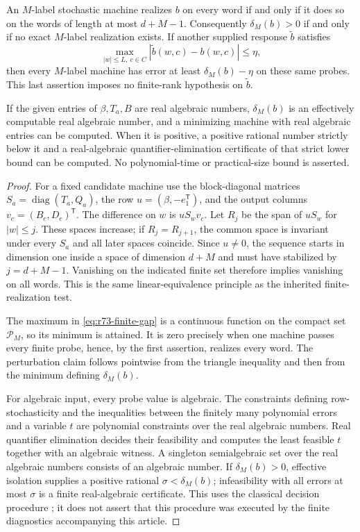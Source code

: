 \begin{theorem}\label{thm:r73-finite-tests}
An $M$-label stochastic machine realizes $b$ on every word if and only if it
does so on the words of length at most $d+M-1$. Consequently
$\delta_M(b)>0$ if and only if no exact $M$-label realization exists.
If another supplied response $\widetilde b$ satisfies
\[
 \max_{|w|\le L,\ c\in C}|\widetilde b(w,c)-b(w,c)|\le\eta,
\]
then every $M$-label machine has error at least $\delta_M(b)-\eta$ on these
same probes. This last assertion imposes no finite-rank hypothesis on
$\widetilde b$.

If the given entries of $\beta,T_a,B$ are real algebraic numbers,
$\delta_M(b)$ is an effectively computable real algebraic number, and a
minimizing machine with real algebraic entries can be computed. When it is
positive, a positive rational number strictly below it and a real-algebraic
quantifier-elimination certificate of that strict lower bound can be computed.
No polynomial-time or practical-size bound is asserted.
\end{theorem}
\begin{proof}
For a fixed candidate machine use the block-diagonal matrices
$S_a=\operatorname{diag}(T_a,Q_a)$, the row
$u=(\beta,-e_1^{\mathsf T})$, and the output columns
$v_c=(B_c,D_c)^{\mathsf T}$. The difference on $w$ is $uS_wv_c$.
Let $R_j$ be the span of $uS_w$ for $|w|\le j$. These spaces increase;
if $R_j=R_{j+1}$, the common space is invariant under every $S_a$ and all
later spaces coincide. Since $u\ne0$, the sequence starts in dimension one
inside a space of dimension $d+M$ and must have stabilized by $j=d+M-1$.
Vanishing on the indicated finite set therefore implies vanishing on all
words. This is the same linear-equivalence principle as the inherited
finite-realization test.

The maximum in \eqref{eq:r73-finite-gap} is a continuous function on the
compact set $\mathcal P_M$, so its minimum is attained. It is zero precisely
when one machine passes every finite probe, hence, by the first assertion,
realizes every word. The perturbation claim follows pointwise from the triangle
inequality and then from the minimum defining $\delta_M(b)$.

For algebraic input, every probe value is algebraic. The constraints defining
row-stochasticity and the inequalities between the finitely many polynomial
errors and a variable $t$ are polynomial constraints over the real algebraic
numbers. Real quantifier elimination decides their feasibility and computes
the least feasible $t$ together with an algebraic witness. A singleton
semialgebraic set over the real algebraic numbers consists of an algebraic
number. If $\delta_M(b)>0$, effective isolation supplies a positive rational
$\sigma<\delta_M(b)$; infeasibility with all errors at most $\sigma$ is a
finite real-algebraic certificate. This uses the classical decision procedure
\cite{Seidenberg54}; it does not assert that this procedure was executed by
the finite diagnostics accompanying this article.
\end{proof}

